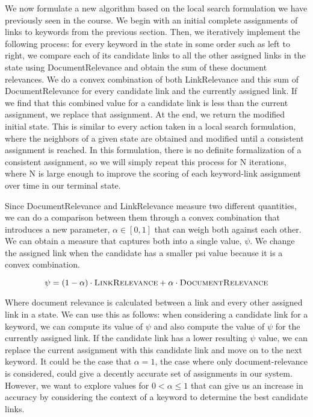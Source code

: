 \documentclass[twoside,11pt]{article}
\begin{document}
We now formulate a new algorithm based on the local search formulation we have previously seen in the course. We begin with an initial complete assignments of links to keywords from the previous section. Then, we iteratively implement the following process: for every keyword in the state in some order such as left to right, we compare each of its candidate links to all the other assigned links in the state using {\sc DocumentRelevance} and obtain the sum of these document relevances. We do a convex combination of both {\sc LinkRelevance} and this sum of {\sc DocumentRelevance} for every candidate link and the currently assigned link. If we find that this combined value for a candidate link is less than the current assignment, we replace that assignment. At the end, we return the modified initial state. This is similar to every action taken in a local search formulation, where the neighbors of a given state are obtained and modified until a consistent assignment is reached. In this formulation, there is no definite formalization of a consistent assignment, so we will simply repeat this process for N iterations, where N is large enough to improve the scoring of each keyword-link assignment over time in our terminal state.

Since {\sc DocumentRelevance} and {\sc LinkRelevance} measure two different quantities, we can do a comparison between them through a convex combination that introduces a new parameter, $\alpha \in [0, 1]$ that can weigh both against each other. We can obtain a measure that captures both into a single value, $\psi$. We change the assigned link when the candidate has a smaller psi value because it is a convex combination.

$$ \psi = (1-\alpha)\cdot\mbox{\sc LinkRelevance} + \alpha\cdot\mbox{\sc DocumentRelevance}$$

Where document relevance is calculated between a link and every other assigned link in a state. We can use this as follows: when considering a candidate link for a keyword, we can compute its value of $\psi$ and also compute the value of $\psi$ for the currently assigned link. If the candidate link has a lower resulting $\psi$ value, we can replace the current assignment with this candidate link and move on to the next keyword. It could be the case that $\alpha = 1$, the case where only document-relevance is considered, could give a decently accurate set of assignments in our system. However, we want to explore values for $0 < \alpha \leq 1$ that can give us an increase in accuracy by considering the context of a keyword to determine the best candidate links.
\end{document}
